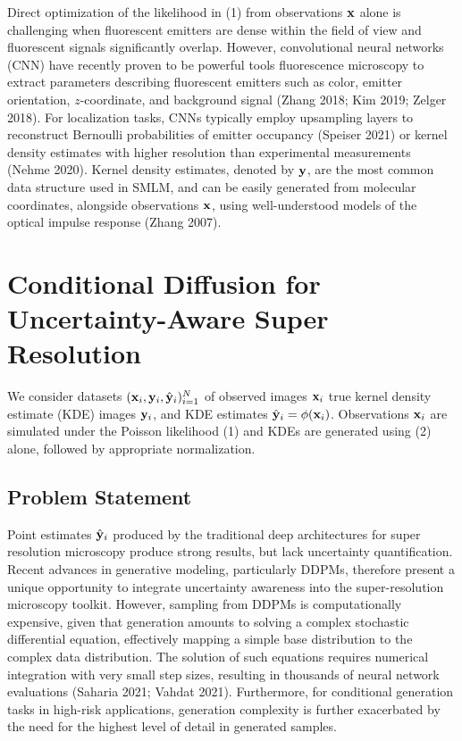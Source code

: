 \documentclass{article}
\begin{document}
Direct optimization of the likelihood in (1) from observations $\bold{x}$ alone is challenging when fluorescent emitters are dense within the field of view and fluorescent signals significantly overlap. However, convolutional neural networks (CNN) have recently proven to be powerful tools fluorescence microscopy to extract parameters describing fluorescent emitters such as color, emitter orientation, $z$-coordinate, and background signal (Zhang 2018; Kim 2019; Zelger 2018). For localization tasks, CNNs typically employ upsampling layers to reconstruct Bernoulli probabilities of emitter occupancy (Speiser 2021) or kernel density estimates with higher resolution than experimental measurements (Nehme 2020). Kernel density estimates, denoted by $\bold{y}$, are the most common data structure used in SMLM, and can be easily generated from molecular coordinates, alongside observations $\bold{x}$, using well-understood models of the optical impulse response (Zhang 2007). 

\section{Conditional Diffusion for Uncertainty-Aware Super Resolution}

We consider datasets $(\bold{x}_i,\bold{y}_i,\hat{\bold{y}}_{i})_{i=1}^{N}$ of observed images $\bold{x}_i$ true kernel density estimate (KDE) images $\bold{y}_{i}$, and KDE estimates $\hat{\bold{y}}_{i}=\phi(\bold{x}_{i})$. Observations $\bold{x}_i$ are simulated under the Poisson likelihood (1) and KDEs are generated using (2) alone, followed by appropriate normalization. 

\subsection{Problem Statement}

Point estimates $\hat{\bold{y}}_{i}$ produced by the traditional deep architectures for super resolution microscopy produce strong results, but lack uncertainty quantification. Recent advances in generative modeling, particularly DDPMs, therefore present a unique opportunity to integrate uncertainty awareness into the super-resolution microscopy toolkit. However, sampling from DDPMs is computationally expensive, given that generation amounts to solving a complex stochastic differential equation, effectively mapping a simple base distribution to the complex data distribution. The solution of such equations requires numerical integration with very small step sizes, resulting in thousands of neural network evaluations (Saharia 2021; Vahdat 2021). Furthermore, for conditional generation tasks in high-risk applications, generation complexity is further exacerbated by the need for the highest level of detail in generated samples.
\end{document}
